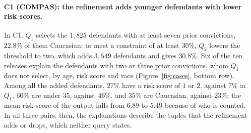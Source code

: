 \paragraph{C1 (COMPAS): the refinement adds younger defendants with lower risk scores.}
In C1, $Q_1$ selects the $1{,}825$ defendants with at least seven prior convictions, $22.8\%$ of them Caucasian; to meet a constraint of at least $30\%$, $Q_2$ lowers the threshold to two, which adds $3{,}549$ defendants and gives $30.8\%$.
Six of the ten releases explain the defendants with two or three prior convictions, whom $Q_1$ does not select, by age, risk score and race (Figure~\ref{fig:cases}, bottom row).
Among all the added defendants, $27\%$ have a risk score of $1$ or $2$, against $7\%$ in $Q_1$, $60\%$ are under $35$, against $46\%$, and $35\%$ are Caucasian, against $23\%$; the mean risk score of the output falls from $6.89$ to $5.49$ because of who is counted.
In all three pairs, then, the explanations describe the tuples that the refinement adds or drops, which neither query states.

